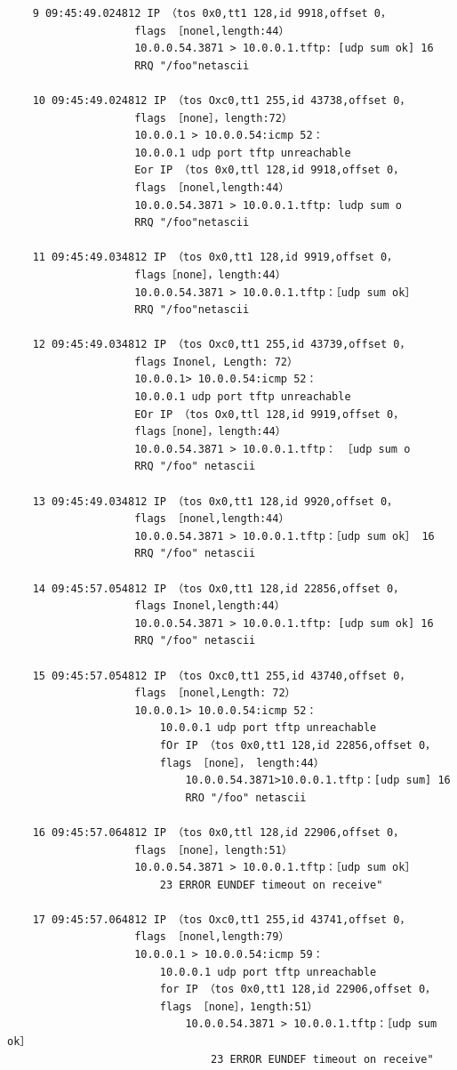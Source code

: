 \begin{verbatim}
	9 09:45:49.024812 IP （tos 0x0,tt1 128,id 9918,offset 0，
					flags ［nonel,length:44）
					10.0.0.54.3871 > 10.0.0.1.tftp: [udp sum ok] 16
					RRQ "/foo"netascii

	10 09:45:49.024812 IP （tos Oxc0,tt1 255,id 43738,offset 0，
					flags ［none］，length:72）
					10.0.0.1 > 10.0.0.54:icmp 52：
					10.0.0.1 udp port tftp unreachable
					Eor IP （tos 0x0,ttl 128,id 9918,offset 0，
					flags ［nonel,length:44）
					10.0.0.54.3871 > 10.0.0.1.tftp: ludp sum o
					RRQ "/foo"netascii

	11 09:45:49.034812 IP （tos 0x0,tt1 128,id 9919,offset 0，
					flags［none］，length:44）
					10.0.0.54.3871 > 10.0.0.1.tftp：［udp sum ok］
					RRQ "/foo"netascii

	12 09:45:49.034812 IP （tos Oxc0,tt1 255,id 43739,offset 0，
					flags Inonel, Length: 72）
					10.0.0.1> 10.0.0.54:icmp 52：
					10.0.0.1 udp port tftp unreachable
					EOr IP （tos Ox0,ttl 128,id 9919,offset 0，
					flags［none］，length:44）
					10.0.0.54.3871 > 10.0.0.1.tftp： ［udp sum o
					RRQ "/foo" netascii

	13 09:45:49.034812 IP （tos 0x0,tt1 128,id 9920,offset 0，
					flags ［nonel,length:44）
					10.0.0.54.3871 > 10.0.0.1.tftp：［udp sum ok］ 16
					RRQ "/foo" netascii

	14 09:45:57.054812 IP （tos Ox0,tt1 128,id 22856,offset 0，
					flags Inonel,length:44）
					10.0.0.54.3871 > 10.0.0.1.tftp: [udp sum ok] 16
					RRQ "/foo" netascii

	15 09:45:57.054812 IP （tos Oxc0,tt1 255,id 43740,offset 0，
					flags ［nonel,Length: 72）
					10.0.0.1> 10.0.0.54:icmp 52：
						10.0.0.1 udp port tftp unreachable
						fOr IP （tos 0x0,tt1 128,id 22856,offset 0，
						flags ［none］， length:44）
							10.0.0.54.3871>10.0.0.1.tftp：[udp sum] 16
							RRO "/foo" netascii

	16 09:45:57.064812 IP （tos 0x0,ttl 128,id 22906,offset 0，
					flags ［none］，length:51）
					10.0.0.54.3871 > 10.0.0.1.tftp：［udp sum ok］
						23 ERROR EUNDEF timeout on receive"

	17 09:45:57.064812 IP （tos Oxc0,tt1 255,id 43741,offset 0，
					flags ［nonel,length:79）
					10.0.0.1 > 10.0.0.54:icmp 59：
						10.0.0.1 udp port tftp unreachable
						for IP （tos 0x0,tt1 128,id 22906,offset 0，
						flags ［none］，1ength:51）
							10.0.0.54.3871 > 10.0.0.1.tftp：［udp sum ok］
								23 ERROR EUNDEF timeout on receive"
\end{verbatim}

